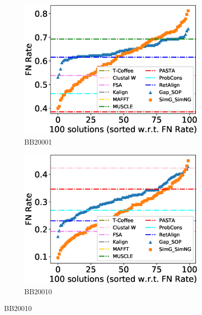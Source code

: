 \begin{figure}[!htbp]
	\centering
	\begin{adjustwidth}{-1.5cm}{-1cm}
		\begin{subfigure}{0.22\textwidth}
			\includegraphics[width=\columnwidth]{Figure/summary/precomputedInit/Balibase/BB20001_fnrate_density_single_run}
			\caption{BB20001}
		\end{subfigure}	
		\begin{subfigure}{0.22\textwidth}
			\includegraphics[width=\columnwidth]{Figure/summary/precomputedInit/Balibase/BB20010_fnrate_density_single_run}
			\caption{BB20010}
		\end{subfigure}

\end{adjustwidth}
\end{figure}
